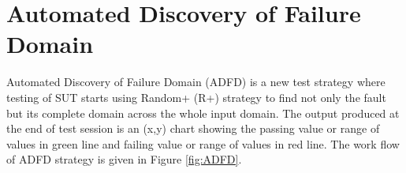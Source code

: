 \documentclass{acm_proc_article-sp}
\begin{document}


\section{Automated Discovery of Failure Domain}\label{sec:adfd}

Automated Discovery of Failure Domain (ADFD) is a new test strategy where testing of SUT starts using Random+ (R+) strategy to find not only the fault but its complete domain across the whole input domain. The output produced at the end of test session is an (x,y) chart showing the passing value or range of values in green line and failing value or range of values in red line. The work flow of ADFD strategy is given in Figure \ref{fig:ADFD}.
\end{document}
